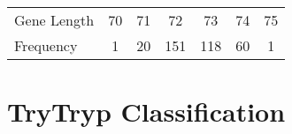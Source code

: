 \documentclass[table,
12pt, %
a4paper, %
oneside, %
headinclude,footinclude, %
BCOR5mm, %
]{scrartcl}
\begin{document}
\begin{table}[htbp]
  \caption{}
  \begin{adjustbox}{width=7cm,center}
    \begin{tabular}{|l|c c c c c c|}
      \hline
      Gene Length & 70 & 71 & 72  & 73  & 74 & 75 \\
      Frequency   & 1  & 20 & 151 & 118 & 60 & 1  \\
      \hline
    \end{tabular}
    \label{table:homo2}
  \end{adjustbox}
\end{table}


\section{TryTryp Classification}
\end{document}
